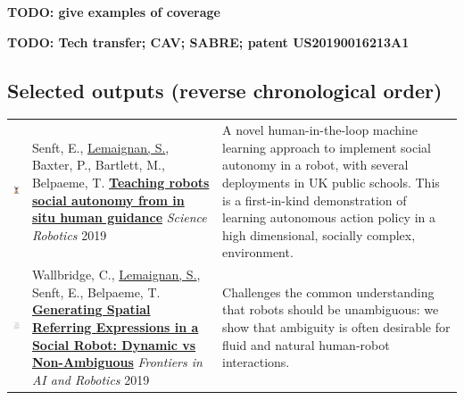 \documentclass[11pt,a4paper]{report}
\newcommand{\TODO}[1]{{\color{red}\textbf{TODO: #1}}}
\begin{document}
\TODO{give examples of coverage}

\TODO{Tech transfer; CAV; SABRE; patent US20190016213A1}

\newpage
\subsection{Selected outputs (reverse chronological order)}

\hspace*{-0.5cm}\begin{tabular}{p{1.7cm}p{7cm}p{8cm}}

    \vspace{-0.2cm}\includegraphics[height=2.2cm]{thumbs/2019-science.png} & Senft, E.,
    \ul{Lemaignan, S.}, Baxter, P., Bartlett, M., Belpaeme, T.
    \newline\href{https://doi.org/10.1126/scirobotics.aat1186}{\textbf{Teaching robots
    social autonomy from in situ human guidance}}
    \newline \textit{Science Robotics} 2019
    & \small A novel human-in-the-loop machine learning approach
    to implement social autonomy in a robot, with several deployments in UK
    public schools. This is a first-in-kind demonstration of learning autonomous
    action policy in a high dimensional, socially complex,
    environment.\textbf{} \\


    \vspace{-.20cm}\includegraphics[height=2.2cm]{thumbs/2019-frontiers-chris.jpg} &

    Wallbridge, C., \ul{Lemaignan, S.}, Senft, E., Belpaeme, T.  
    \newline\href{https://doi.org/10.3389/frobt.2019.00067}{\textbf{Generating
    Spatial Referring Expressions in a Social Robot: Dynamic vs Non-Ambiguous}}
    \newline \textit{Frontiers in AI and Robotics} 2019
    & \small Challenges the common understanding that robots should be
    unambiguous: we show that ambiguity is often desirable for fluid and natural
    human-robot interactions.\textbf{}  \\


\end{tabular}
\end{document}
